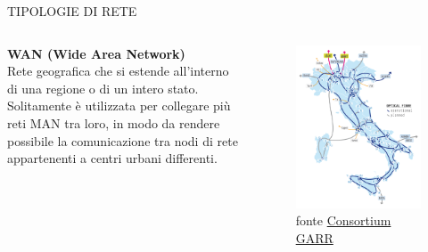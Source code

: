 \documentclass[aspectratio=1610, handout]{beamer}
\begin{document}
\begin{frame}{TIPOLOGIE DI RETE}
    \begin{columns}
            \justifying
            \textbf{WAN (Wide Area Network)} \\
            Rete geografica che si estende all'interno di una regione o di un intero stato. Solitamente è utilizzata 
            per collegare più reti MAN tra loro, in modo da rendere possibile la comunicazione tra nodi di rete 
            appartenenti a centri urbani differenti.
            \begin{figure}
                \includegraphics[width=0.77\linewidth]{img/wan.png}
                \caption{{fonte \href{https://www.garr.it/it/infrastrutture/rete-nazionale/mappa-della-rete}{Consortium GARR}}}
            \end{figure}
    \end{columns}
\end{frame}
\end{document}
